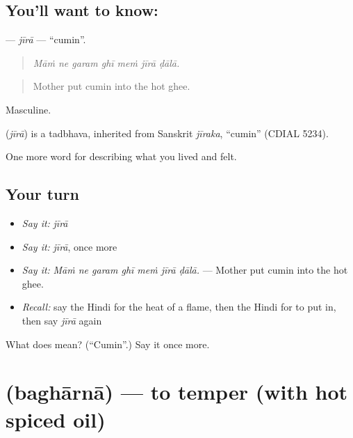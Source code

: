\subsection*{You'll want to know: }
\textbf{} — \emph{jīrā} — \textquotedblleft{}cumin\textquotedblright{}.

\begin{quote}
      
\end{quote}

\begin{quote}
\emph{Māṁ ne garam ghī meṁ jīrā ḍālā.}
\end{quote}

\begin{quote}
Mother put cumin into the hot ghee.
\end{quote}

Masculine.

\begin{cousinweb}
\textbf{} (\emph{jīrā}) is a tadbhava, inherited from Sanskrit \emph{jīraka}, \textquotedblleft{}cumin\textquotedblright{} (CDIAL 5234).
\end{cousinweb}

\begin{grammarlens}[title={What you've built}]
One more word for describing what you lived and felt.
\end{grammarlens}

\subsection*{Your turn}
\begin{itemize}
\raggedright
  \item \emph{Say it:} \emph{jīrā}
  \item \emph{Say it:} \emph{jīrā}, once more
  \item \emph{Say it:} \emph{Māṁ ne garam ghī meṁ jīrā ḍālā.} — Mother put cumin into the hot ghee.
  \item \emph{Recall:} say the Hindi for the heat of a flame, then the Hindi for to put in, then say \emph{jīrā} again
\end{itemize}

\begin{tcolorbox}[breakable,colback=teal!4,colframe=teal!35!black,title={Before you move on}]
What does  mean? (\textquotedblleft{}Cumin\textquotedblright{}.) Say it once more.
\end{tcolorbox}
\section[\texorpdfstring{\hi{बघारना} (baghārnā)}{बघारना (baghārnā)}]{ (baghārnā) — to temper (with hot spiced oil)}

